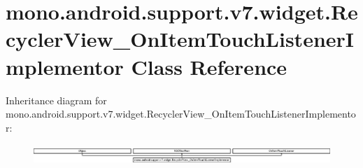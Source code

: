\hypertarget{classmono_1_1android_1_1support_1_1v7_1_1widget_1_1_recycler_view___on_item_touch_listener_implementor}{}\section{mono.\+android.\+support.\+v7.\+widget.\+Recycler\+View\+\_\+\+On\+Item\+Touch\+Listener\+Implementor Class Reference}
\label{classmono_1_1android_1_1support_1_1v7_1_1widget_1_1_recycler_view___on_item_touch_listener_implementor}
Inheritance diagram for mono.\+android.\+support.\+v7.\+widget.\+Recycler\+View\+\_\+\+On\+Item\+Touch\+Listener\+Implementor\+:\begin{figure}[H]
\begin{center}
\leavevmode
\includegraphics[height=0.782669cm]{classmono_1_1android_1_1support_1_1v7_1_1widget_1_1_recycler_view___on_item_touch_listener_implementor}
\end{center}
\end{figure}
